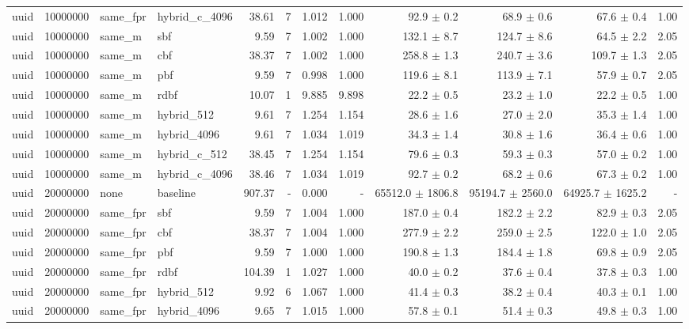 \begin{tabular}{llllrrrrrrrr}
uuid & 10000000 & same\_fpr & hybrid\_c\_4096 & 38.61 & 7 & 1.012 & 1.000 & 92.9 $\pm$ 0.2 & 68.9 $\pm$ 0.6 & 67.6 $\pm$ 0.4 & 1.00 \\
uuid & 10000000 & same\_m & sbf & 9.59 & 7 & 1.002 & 1.000 & 132.1 $\pm$ 8.7 & 124.7 $\pm$ 8.6 & 64.5 $\pm$ 2.2 & 2.05 \\
uuid & 10000000 & same\_m & cbf & 38.37 & 7 & 1.002 & 1.000 & 258.8 $\pm$ 1.3 & 240.7 $\pm$ 3.6 & 109.7 $\pm$ 1.3 & 2.05 \\
uuid & 10000000 & same\_m & pbf & 9.59 & 7 & 0.998 & 1.000 & 119.6 $\pm$ 8.1 & 113.9 $\pm$ 7.1 & 57.9 $\pm$ 0.7 & 2.05 \\
uuid & 10000000 & same\_m & rdbf & 10.07 & 1 & 9.885 & 9.898 & 22.2 $\pm$ 0.5 & 23.2 $\pm$ 1.0 & 22.2 $\pm$ 0.5 & 1.00 \\
uuid & 10000000 & same\_m & hybrid\_512 & 9.61 & 7 & 1.254 & 1.154 & 28.6 $\pm$ 1.6 & 27.0 $\pm$ 2.0 & 35.3 $\pm$ 1.4 & 1.00 \\
uuid & 10000000 & same\_m & hybrid\_4096 & 9.61 & 7 & 1.034 & 1.019 & 34.3 $\pm$ 1.4 & 30.8 $\pm$ 1.6 & 36.4 $\pm$ 0.6 & 1.00 \\
uuid & 10000000 & same\_m & hybrid\_c\_512 & 38.45 & 7 & 1.254 & 1.154 & 79.6 $\pm$ 0.3 & 59.3 $\pm$ 0.3 & 57.0 $\pm$ 0.2 & 1.00 \\
uuid & 10000000 & same\_m & hybrid\_c\_4096 & 38.46 & 7 & 1.034 & 1.019 & 92.7 $\pm$ 0.2 & 68.2 $\pm$ 0.6 & 67.3 $\pm$ 0.2 & 1.00 \\
uuid & 20000000 & none & baseline & 907.37 & - & 0.000 & - & 65512.0 $\pm$ 1806.8 & 95194.7 $\pm$ 2560.0 & 64925.7 $\pm$ 1625.2 & - \\
uuid & 20000000 & same\_fpr & sbf & 9.59 & 7 & 1.004 & 1.000 & 187.0 $\pm$ 0.4 & 182.2 $\pm$ 2.2 & 82.9 $\pm$ 0.3 & 2.05 \\
uuid & 20000000 & same\_fpr & cbf & 38.37 & 7 & 1.004 & 1.000 & 277.9 $\pm$ 2.2 & 259.0 $\pm$ 2.5 & 122.0 $\pm$ 1.0 & 2.05 \\
uuid & 20000000 & same\_fpr & pbf & 9.59 & 7 & 1.000 & 1.000 & 190.8 $\pm$ 1.3 & 184.4 $\pm$ 1.8 & 69.8 $\pm$ 0.9 & 2.05 \\
uuid & 20000000 & same\_fpr & rdbf & 104.39 & 1 & 1.027 & 1.000 & 40.0 $\pm$ 0.2 & 37.6 $\pm$ 0.4 & 37.8 $\pm$ 0.3 & 1.00 \\
uuid & 20000000 & same\_fpr & hybrid\_512 & 9.92 & 6 & 1.067 & 1.000 & 41.4 $\pm$ 0.3 & 38.2 $\pm$ 0.4 & 40.3 $\pm$ 0.1 & 1.00 \\
uuid & 20000000 & same\_fpr & hybrid\_4096 & 9.65 & 7 & 1.015 & 1.000 & 57.8 $\pm$ 0.1 & 51.4 $\pm$ 0.3 & 49.8 $\pm$ 0.3 & 1.00 \\

\end{tabular}
